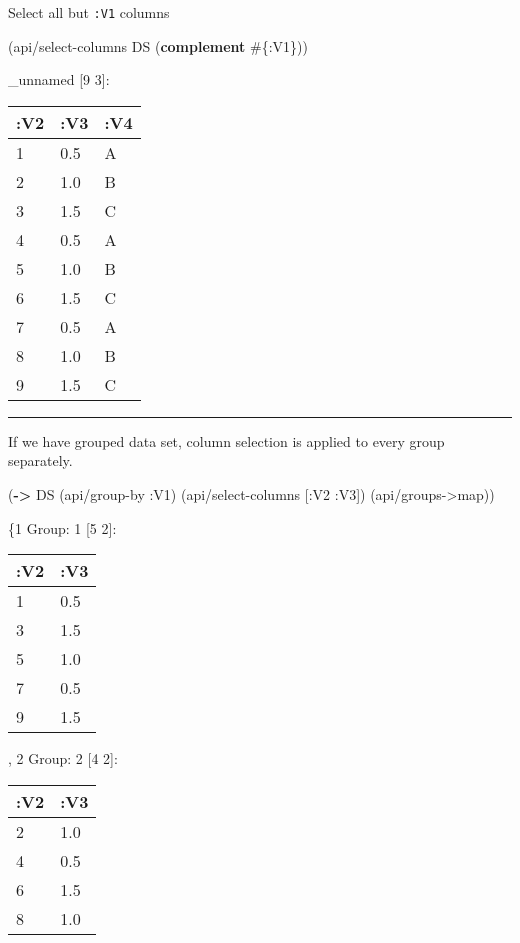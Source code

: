 \documentclass[]{article}
\newenvironment{Shaded}{\begin{snugshade}}{\end{snugshade}}
\newcommand{\AttributeTok}[1]{\textcolor[rgb]{0.77,0.63,0.00}{#1}}
\newcommand{\KeywordTok}[1]{\textcolor[rgb]{0.13,0.29,0.53}{\textbf{#1}}}
\newcommand{\NormalTok}[1]{#1}
\begin{document}
Select all but \texttt{:V1} columns

\begin{Shaded}
\begin{Highlighting}[]
\NormalTok{(api/select-columns DS (}\KeywordTok{complement}\NormalTok{ #\{}\AttributeTok{:V1}\NormalTok{\}))}
\end{Highlighting}
\end{Shaded}

\_unnamed {[}9 3{]}:

\begin{longtable}[]{@{}lll@{}}
\toprule
:V2 & :V3 & :V4\tabularnewline
\midrule
\endhead
1 & 0.5 & A\tabularnewline
2 & 1.0 & B\tabularnewline
3 & 1.5 & C\tabularnewline
4 & 0.5 & A\tabularnewline
5 & 1.0 & B\tabularnewline
6 & 1.5 & C\tabularnewline
7 & 0.5 & A\tabularnewline
8 & 1.0 & B\tabularnewline
9 & 1.5 & C\tabularnewline
\bottomrule
\end{longtable}

\begin{center}\rule{0.5\linewidth}{0.5pt}\end{center}

If we have grouped data set, column selection is applied to every group
separately.

\begin{Shaded}
\begin{Highlighting}[]
\NormalTok{(}\KeywordTok{->}\NormalTok{ DS}
\NormalTok{    (api/group-by }\AttributeTok{:V1}\NormalTok{)}
\NormalTok{    (api/select-columns [}\AttributeTok{:V2} \AttributeTok{:V3}\NormalTok{])}
\NormalTok{    (api/groups->map))}
\end{Highlighting}
\end{Shaded}

\{1 Group: 1 {[}5 2{]}:

\begin{longtable}[]{@{}ll@{}}
\toprule
:V2 & :V3\tabularnewline
\midrule
\endhead
1 & 0.5\tabularnewline
3 & 1.5\tabularnewline
5 & 1.0\tabularnewline
7 & 0.5\tabularnewline
9 & 1.5\tabularnewline
\bottomrule
\end{longtable}

, 2 Group: 2 {[}4 2{]}:

\begin{longtable}[]{@{}ll@{}}
\toprule
:V2 & :V3\tabularnewline
\midrule
\endhead
2 & 1.0\tabularnewline
4 & 0.5\tabularnewline
6 & 1.5\tabularnewline
8 & 1.0\tabularnewline
\bottomrule
\end{longtable}
\end{document}

